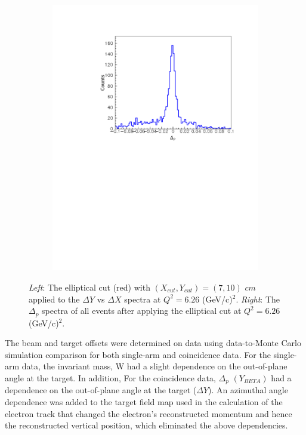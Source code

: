 \documentclass[12pt]{article}
\begin{document}
\begin{figure}[htbp]
          \begin{subfigure}[htbp]{0.49\textwidth}
                \centering
               \includegraphics[width=\textwidth]{dp_cut5}
                \label{ydiff}
        \end{subfigure}    
        
\caption{\emph{Left}: The elliptical cut (red) with $(X_{cut},Y_{cut})=(7,10)$ $cm$ applied to the $\Delta Y$ vs $\Delta X$ spectra at $Q^2=6.26$ (GeV/c)$^2$. \emph{Right}: The $\Delta_p$ spectra of all events after applying the elliptical cut at $Q^2=6.26$ (GeV/c)$^2$.}
\label{xydiff}                  
\end{figure}

The beam and target offsets were determined on data using data-to-Monte Carlo simulation comparison for both single-arm and coincidence data. For the single-arm data, the invariant mass, W had a slight dependence on the out-of-plane angle at the target. In addition, For the coincidence data, $\Delta_p$ $(Y_{BETA})$ had a dependence on the out-of-plane angle at the target ($\Delta Y$). An azimuthal angle dependence was added to the target field map used in the calculation of the electron track that changed the electron's reconstructed momentum and hence the reconstructed vertical position, which eliminated the above dependencies. 
\end{document}
